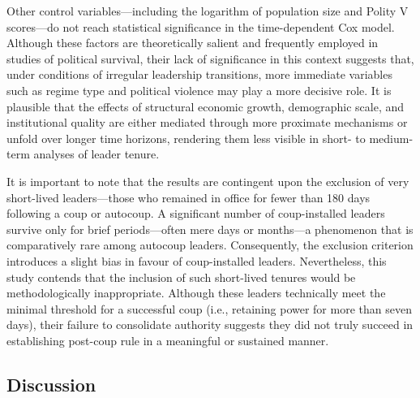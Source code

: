 \documentclass[
  12pt,
]{report}
\begin{document}
Other control variables---including the logarithm of population size and
Polity V scores---do not reach statistical significance in the
time-dependent Cox model. Although these factors are theoretically
salient and frequently employed in studies of political survival, their
lack of significance in this context suggests that, under conditions of
irregular leadership transitions, more immediate variables such as
regime type and political violence may play a more decisive role. It is
plausible that the effects of structural economic growth, demographic
scale, and institutional quality are either mediated through more
proximate mechanisms or unfold over longer time horizons, rendering them
less visible in short- to medium-term analyses of leader tenure.

It is important to note that the results are contingent upon the
exclusion of very short-lived leaders---those who remained in office for
fewer than 180 days following a coup or autocoup. A significant number
of coup-installed leaders survive only for brief periods---often mere
days or months---a phenomenon that is comparatively rare among autocoup
leaders. Consequently, the exclusion criterion introduces a slight bias
in favour of coup-installed leaders. Nevertheless, this study contends
that the inclusion of such short-lived tenures would be methodologically
inappropriate. Although these leaders technically meet the minimal
threshold for a successful coup (i.e., retaining power for more than
seven days), their failure to consolidate authority suggests they did
not truly succeed in establishing post-coup rule in a meaningful or
sustained manner.

\subsection*{Discussion}\label{discussion}
\end{document}
